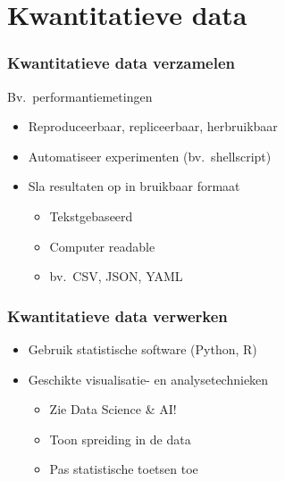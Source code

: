 \documentclass[aspectratio=169]{beamer}
\begin{document}
\section{Kwantitatieve data}

\begin{frame}
  \frametitle{Kwantitatieve data verzamelen}

  Bv.\ performantiemetingen

  \begin{itemize}
    \item Reproduceerbaar, repliceerbaar, herbruikbaar
    \item Automatiseer experimenten (bv.\ shellscript)
    \item Sla resultaten op in bruikbaar formaat
          \begin{itemize}
            \item Tekstgebaseerd
            \item Computer readable
            \item bv.\ CSV, JSON, YAML
          \end{itemize}
  \end{itemize}

\end{frame}

\begin{frame}
  \frametitle{Kwantitatieve data verwerken}

  \begin{itemize}
    \item Gebruik statistische software (Python, R)
    \item Geschikte visualisatie- en analysetechnieken
          \begin{itemize}
            \item Zie Data Science \& AI!
            \item Toon spreiding in de data
            \item Pas statistische toetsen toe
          \end{itemize}
  \end{itemize}

\end{frame}
\end{document}

